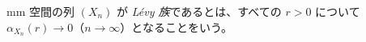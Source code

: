 mm 空間の列 $(X_n)$ が \emph{Lévy 族}であるとは、すべての $r > 0$ について
$\alpha_{X_n}(r) \to 0$（$n \to \infty$）となることをいう。
